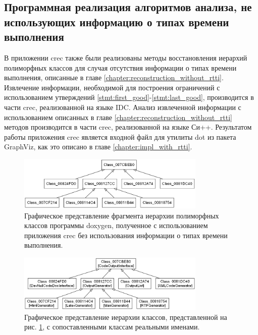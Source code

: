 \subsection{Программная реализация алгоритмов анализа, не использующих информацию о типах времени выполнения}
В приложении crec также были реализованы методы восстановления иерархий полиморфных классов для случая отсутствия информации о типах времени выполнения, описанные в главе \ref{chapter:reconstruction_without_rtti}. Извлечение информации, необходимой для построения ограничений с использованием утверждений \ref{stmt:first_good}-\ref{stmt:last_good}, производится в части crec, реализованной на языке IDC. Анализ извлеченной информации с использованием описанных в главе \ref{chapter:reconstruction_without_rtti} методов производится в части crec, реализованной на языке Си++. Результатом работы приложения crec является входной файл для утилиты dot из пакета GraphViz, как это описано в главе \ref{chapter:impl_with_rtti}.

\begin{figure}[htb!]
\centering
\includegraphics[width=0.8\textwidth]{images/doxy_objtree_nortti.png}
\caption{Графическое представление фрагмента иерархии полиморфных классов программы doxygen, полученное с использованием приложения crec без использования информации о типах времени выполнения.}
\label{fig:doxy_objtree_nortti}
\end{figure}

\begin{figure}[htb!]
\centering
\includegraphics[width=0.8\textwidth]{images/doxy_objtree_nortti_label.png}
\caption{Графическое представление иерархии классов, представленной на рис. \ref{fig:doxy_objtree_nortti}, с сопоставленными классам реальными именами.}
\label{fig:doxy_objtree_nortti_label}
\end{figure}


